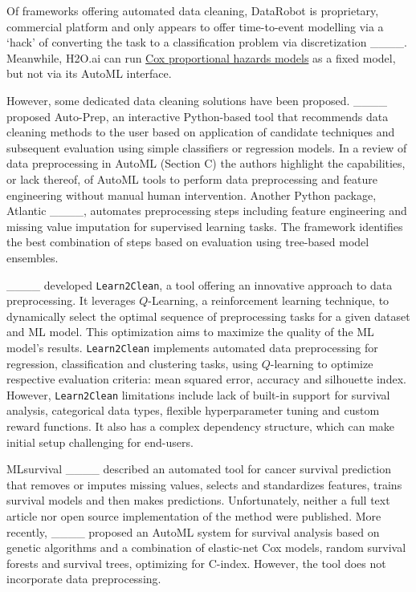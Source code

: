 Of frameworks offering automated data cleaning, DataRobot is
proprietary, commercial platform and only appears to offer time-to-event
modelling via a `hack' of converting the task to a classification
problem via discretization ____.
Meanwhile, H2O.ai can run
\href{https://docs.h2o.ai/h2o/latest-stable/h2o-docs/data-science/coxph.html}{Cox
proportional hazards models} as a fixed model, but not via its AutoML
interface.

However, some dedicated data cleaning solutions have been proposed.
____ proposed Auto-Prep, an interactive Python-based tool
that recommends data cleaning methods to the user based on application
of candidate techniques and subsequent evaluation using simple
classifiers or regression models. In a review of data preprocessing in
AutoML (Section C) the authors highlight the capabilities, or lack
thereof, of AutoML tools to perform data preprocessing and feature
engineering without manual human intervention. Another Python package,
Atlantic ____, automates preprocessing steps including
feature engineering and missing value imputation for supervised learning
tasks. The framework identifies the best combination of steps based on
evaluation using tree-based model ensembles.

____ developed \texttt{Learn2Clean}, a tool offering
an innovative approach to data preprocessing. It leverages
\(Q\)-Learning, a reinforcement learning technique, to dynamically
select the optimal sequence of preprocessing tasks for a given dataset
and ML model. This optimization aims to maximize the quality of the ML
model's results. \texttt{Learn2Clean} implements automated data
preprocessing for regression, classification and clustering tasks, using
\(Q\)-learning to optimize respective evaluation criteria: mean squared
error, accuracy and silhouette index. However, \texttt{Learn2Clean}
limitations include lack of built-in support for survival analysis,
categorical data types, flexible hyperparameter tuning and custom reward
functions. It also has a complex dependency structure, which can make
initial setup challenging for end-users.

MLsurvival ____ described an automated tool for cancer
survival prediction that removes or imputes missing values, selects and
standardizes features, trains survival models and then makes
predictions. Unfortunately, neither a full text article nor open source
implementation of the method were published. More recently,
____ proposed an AutoML system for survival analysis
based on genetic algorithms and a combination of elastic-net Cox models,
random survival forests and survival trees, optimizing for C-index.
However, the tool does not incorporate data preprocessing.
